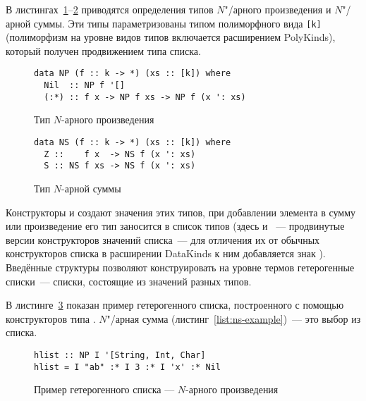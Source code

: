В листингах~\ref{list:np}--\ref{list:ns} приводятся определения типов $N$"/арного произведения и $N$"/арной суммы. Эти типы параметризованы типом полиморфного вида \lstinline{[k]} (полиморфизм на уровне видов типов включается расширением \textsf{PolyKinds}), который получен продвижением типа списка.
\begin{figure}[h]
\begin{framed}
\vspace{-0.25cm}
\begin{lstlisting}
data NP (f :: k -> *) (xs :: [k]) where
  Nil  :: NP f '[]
  (:*) :: f x -> NP f xs -> NP f (x ': xs)
\end{lstlisting}
\vspace{-0.25cm}
\end{framed}
\caption{Тип $N$-арного произведения}
\label{list:np}
\end{figure}

\begin{figure}[h]
\begin{framed}
\vspace{-0.25cm}
\begin{lstlisting}
data NS (f :: k -> *) (xs :: [k]) where
  Z ::    f x  -> NS f (x ': xs)
  S :: NS f xs -> NS f (x ': xs)
\end{lstlisting}
\vspace{-0.25cm}
\end{framed}
\caption{Тип $N$-арной суммы}
\label{list:ns}
\end{figure}

Конструкторы  и  создают значения этих типов, при добавлении элемента в сумму или произведение его тип заносится в список типов (здесь  и ~--- продвинутые версии конструкторов значений списка~--- для отличения их от обычных конструкторов списка в расширении \textsf{DataKinds} к ним добавляется знак ). Введённые структуры позволяют конструировать на уровне термов гетерогенные списки~--- списки, состоящие из значений разных типов.

В листинге~\ref{list:np-example} показан пример гетерогенного списка, построенного с помощью конструкторов типа . $N$"/арная сумма (листинг~\ref{list:ns-example})~--- это выбор из списка.
\begin{figure}[h]
\begin{framed}
\vspace{-0.25cm}
\begin{lstlisting}
hlist :: NP I '[String, Int, Char]
hlist = I "ab" :* I 3 :* I 'x' :* Nil
\end{lstlisting}
\vspace{-0.25cm}
\end{framed}
\caption{Пример гетерогенного списка --- $N$-арного произведения}
\label{list:np-example}
\end{figure}

